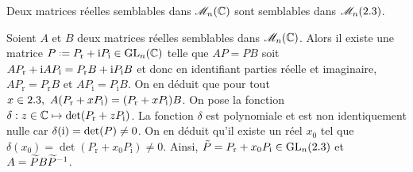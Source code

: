 




\begin{tcolorbox}
    Deux matrices réelles semblables dans $\mathscr{M}_n(\mathbb{C})$ sont semblables dans $\mathscr{M}_n(2.3)$.
\end{tcolorbox}

\begin{preuve}
    Soient $A$ et $B$ deux matrices réelles semblables dans $\mathscr{M}_n(\mathbb{C})$. Alors il existe une matrice $P \defeq P_{\mathrm{r}} + \mi P_{\mathrm{i}} \in \Gl_n(\C)$ telle que $AP = PB$ soit $A P_{\mathrm{r}} + \mathrm{i} A P_{\mathrm{i}} = P_{\mathrm{r}} B + \mathrm{i} P_{\mathrm{i}} B$ et donc en identifiant parties réelle et imaginaire, $A P_{\mathrm{r}} = P_{\mathrm{r}} B$ et $A P_{\mathrm{i}} = P_{\mathrm{i}} B$. On en déduit que pour tout $x \in \R,\ A(P_{\mathrm{r}} + x P_{\mathrm{i}}) = (P_{\mathrm{r}} + x P_{\mathrm{i}})B$. On pose la fonction $\delta : z \in \mathbb{C} \mapsto \det(P_{\mathrm{r}} + z P_{\mathrm{i}})$. La fonction $\delta$ est polynomiale et est non identiquement nulle car $\delta(\mathrm{i}) = \det(P) \not=0$. On en déduit qu'il existe un réel $x_0$ tel que $\delta(x_0) = \det(P_{\mathrm{r}} + x_0 P_{\mathrm{i}}) \not=0$. 
    Ainsi, $\tilde{P} = P_{\mathrm{r}} + x_0 P_{\mathrm{i}} \in \mathrm{GL}_n(2.3)$ et $A = \widetilde{P}B\widetilde{P}^{-1}$.
\end{preuve}